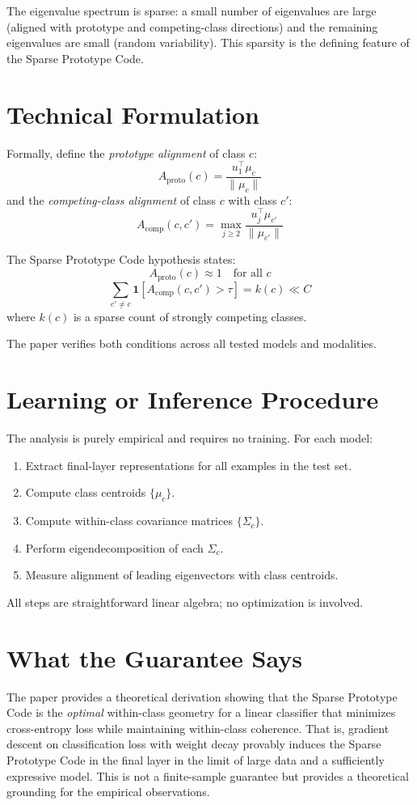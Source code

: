 \documentclass[10pt,twocolumn]{article}
\begin{document}
The eigenvalue spectrum is sparse: a small number of eigenvalues are large
(aligned with prototype and competing-class directions) and the remaining
eigenvalues are small (random variability). This sparsity is the defining
feature of the Sparse Prototype Code.

\section{Technical Formulation}

Formally, define the \emph{prototype alignment} of class $c$:
\[
  A_{\text{proto}}(c) = \frac{u_1^\top \mu_c}{\|\mu_c\|}
\]
and the \emph{competing-class alignment} of class $c$ with class $c'$:
\[
  A_{\text{comp}}(c, c') = \max_{j \geq 2} \frac{u_j^\top \mu_{c'}}{\|\mu_{c'}\|}
\]

The Sparse Prototype Code hypothesis states:
\[
  A_{\text{proto}}(c) \approx 1 \quad \text{for all } c
\]
\[
  \sum_{c' \neq c} \mathbf{1}[A_{\text{comp}}(c,c') > \tau] = k(c) \ll C
\]
where $k(c)$ is a sparse count of strongly competing classes.

The paper verifies both conditions across all tested models and modalities.

\section{Learning or Inference Procedure}

The analysis is purely empirical and requires no training. For each model:
\begin{enumerate}[itemsep=2pt,parsep=0pt]
  \item Extract final-layer representations for all examples in the test set.
  \item Compute class centroids $\{\mu_c\}$.
  \item Compute within-class covariance matrices $\{\Sigma_c\}$.
  \item Perform eigendecomposition of each $\Sigma_c$.
  \item Measure alignment of leading eigenvectors with class centroids.
\end{enumerate}
All steps are straightforward linear algebra; no optimization is involved.

\section{What the Guarantee Says}

The paper provides a theoretical derivation showing that the Sparse Prototype
Code is the \emph{optimal} within-class geometry for a linear classifier that
minimizes cross-entropy loss while maintaining within-class coherence. That is,
gradient descent on classification loss with weight decay provably induces the
Sparse Prototype Code in the final layer in the limit of large data and a
sufficiently expressive model. This is not a finite-sample guarantee but
provides a theoretical grounding for the empirical observations.
\end{document}
